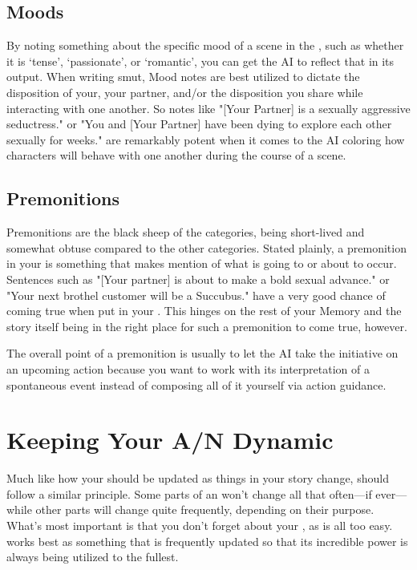 ﻿\documentclass[Coomer-main.tex]{subfiles}
\begin{document}
\subsection{Moods}

By noting something about the specific mood of a scene in the \an, such as whether it is ‘tense’, ‘passionate’, or ‘romantic’, you can get the AI to reflect that in its output.
When writing smut, Mood notes are best utilized to dictate the disposition of your, your partner, and/or the disposition you share while interacting with one another.
So notes like "[Your Partner] is a sexually aggressive seductress." or "You and [Your Partner] have been dying to explore each other sexually for weeks." are remarkably potent when it comes to the AI coloring how characters will behave with one another during the course of a scene.

\subsection{Premonitions}

Premonitions are the black sheep of the \an categories, being short-lived and somewhat obtuse compared to the other categories.
Stated plainly, a premonition in your \an is something that makes mention of what is going to or about to occur.
Sentences such as "[Your partner] is about to make a bold sexual advance." or "Your next brothel customer will be a Succubus." have a very good chance of coming true when put in your \an.
This hinges on the rest of your Memory and the story itself being in the right place for such a premonition to come true, however.

The overall point of a premonition is usually to let the AI take the initiative on an upcoming action because you want to work with its interpretation of a spontaneous event instead of composing all of it yourself via action guidance.

\section{Keeping Your A/N Dynamic}

Much like how your \rem should be updated as things in your story change, \an should follow a similar principle.
Some parts of an \an won't change all that often—if ever—while other parts will change quite frequently, depending on their purpose.
What's most important is that you don't forget about your \an, as is all too easy. \an works best as something that is frequently updated so that its incredible power is always being utilized to the fullest.
\end{document}
